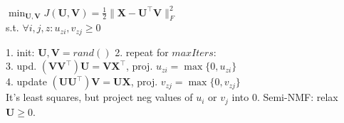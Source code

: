 $\min_{\mathbf{U}, \mathbf{V}} J(\mathbf{U}, \mathbf{V}) = \frac{1}{2} \|\mathbf{X} - \mathbf{U}^\top\mathbf{V}\|_F^2$\\
s.t. $\forall i,j,z:u_{zi},v_{zj} \geq 0 $


1. init: $\mathbf{U}, \mathbf{V} = rand()$ 2. repeat for $\mathit{maxIters}$:\\
3. upd. $(\mathbf{VV}^\top)\mathbf{U} = \mathbf{VX}^\top$, proj. $u_{zi} = \max \{ 0, u_{zi} \}$\\
4. update $(\mathbf{UU}^\top)\mathbf{V} = \mathbf{UX}$, proj. $v_{zj} = \max \{ 0, v_{zj} \}$\\
It's least squares, but project neg values of $u_i$ or $v_j$ into $0$. Semi-NMF: relax $\mathbf{U} \geq 0$.
